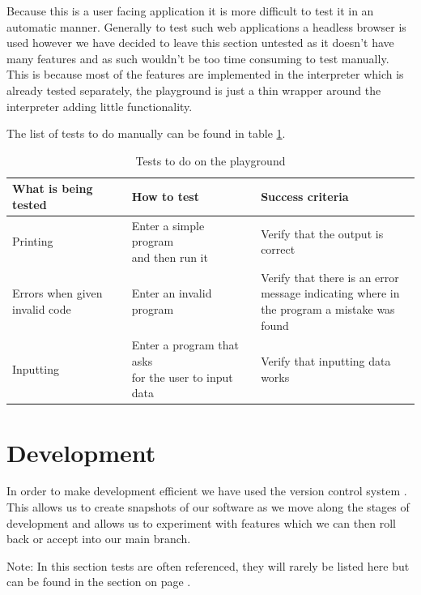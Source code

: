 \documentclass{article}
\begin{document}
Because this is a user facing application it is more difficult to test it in an
automatic manner. Generally to test such web applications a headless browser is
used however we have decided to leave this section untested as it doesn't have
many features and as such wouldn't be too time consuming to test manually. This
is because most of the features are implemented in the interpreter which is
already tested separately, the playground is just a thin wrapper around the
interpreter adding little functionality.

The list of tests to do manually can be found in table
\ref{tbl:playground_tests}.

\begin{table}
	\begin{adjustbox}{center}
	\begin{tabular}{|l|l|l|}
		\hline
		What is being tested & How to test & Success criteria \\
		\hline
		Printing & \makecell[ll]{Enter a simple program \\ and then run it} & Verify that the
		output is correct \\
		\hline
		\makecell[ll]{Errors when given \\ invalid code} & Enter an invalid program &
		\makecell[ll]{Verify that there is an error \\ message indicating where
		in \\ the program a mistake was found} \\
		\hline
		Inputting & \makecell[ll]{Enter a program that asks \\ for the user to
		input data} &
		Verify that inputting data works \\
		\hline
	\end{tabular}
	\end{adjustbox}
	\caption{Tests to do on the playground}
	\label{tbl:playground_tests}
\end{table}

\section{Development}

In order to make development efficient we have used the version control system
. This allows us to create snapshots of our software as we move
along the stages of development and allows us to experiment with features which
we can then roll back or accept into our main branch.

Note: In this section tests are often referenced, they will rarely be listed
here but can be found in the section  on page
\pageref{sec:final_project}.
\end{document}
